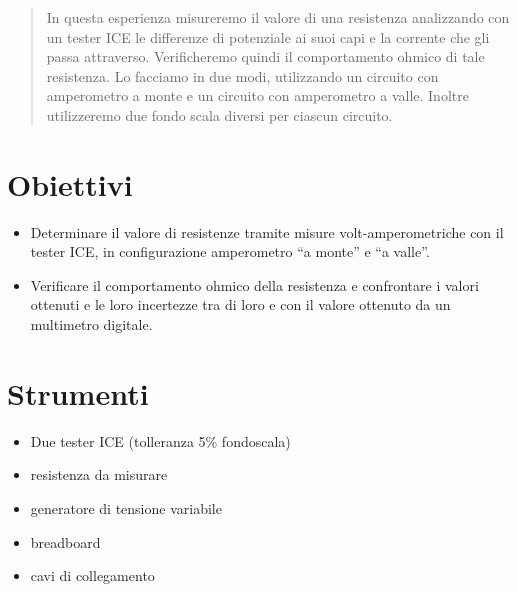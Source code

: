\documentclass[12pt]{article}
\begin{document}
  
	\newpage
	\renewcommand{\abstractname}{Abstract}
	
	\begin{abstract}
In questa esperienza misureremo il valore di una resistenza analizzando con un tester ICE le differenze di potenziale ai suoi capi e la corrente che gli passa attraverso. Verificheremo quindi il comportamento ohmico di tale resistenza. Lo facciamo in due modi, utilizzando un circuito con amperometro a monte e un circuito con amperometro a valle. Inoltre utilizzeremo due fondo scala diversi per ciascun circuito. 
	\end{abstract}
  \vspace{10em}
\tableofcontents
  \newpage
\section{Obiettivi}
\begin{itemize}
\item Determinare il valore di resistenze tramite misure volt-amperometriche con il tester
ICE, in configurazione amperometro “a monte” e “a valle”.
\item Verificare il comportamento ohmico della resistenza e confrontare i valori ottenuti e
le loro incertezze tra di loro e con il valore ottenuto da un multimetro digitale.
\end{itemize}
\section{Strumenti}
\begin{itemize}
\item Due tester ICE (tolleranza 5\% fondoscala)
\item resistenza da misurare
\item generatore di tensione variabile
\item breadboard
\item cavi di collegamento
\end{itemize}
\end{document}
